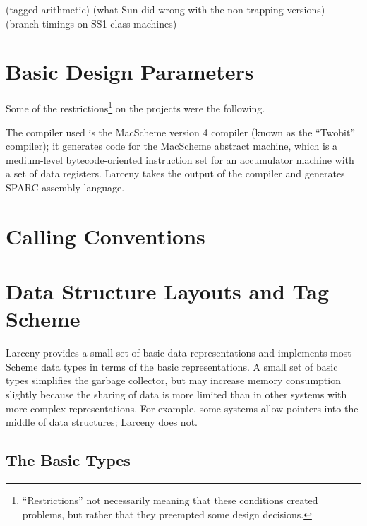 (tagged arithmetic)
(what Sun did wrong with the non-trapping versions)
(branch timings on SS1 class machines)

\section{Basic Design Parameters}
\label{DesignParametersSection}


Some of the restrictions\footnote{``Restrictions'' not necessarily meaning
that these conditions created problems, but rather that they preempted some
design decisions.} on the projects were the following.

The compiler used is the MacScheme version 4 compiler (known as the
``Twobit'' compiler); it generates code for the MacScheme abstract machine,
which is a medium-level bytecode-oriented instruction set for an accumulator
machine with a set of data registers. Larceny takes the
output of the compiler and generates SPARC assembly language.


\section{Calling Conventions}
\label{CallingSection}


\section{Data Structure Layouts and Tag Scheme}

Larceny provides a small set of basic data representations and implements
most Scheme data types in terms of the basic representations. A small set of
basic types simplifies the garbage collector, but may increase memory
consumption slightly because the sharing of data is more limited than in
other systems with more complex representations. For example, some systems
allow pointers into the middle of data structures; Larceny does not.

\subsection{The Basic Types}

